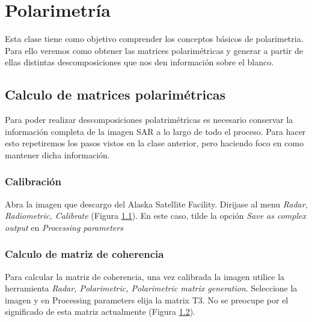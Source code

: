 \chapter{Polarimetría}

Esta clase tiene como objetivo comprender los conceptos básicos de polarimetria. Para ello veremos como obtener las matrices polarimétricas y generar a partir de ellas distintas descomposiciones que nos den información sobre el blanco.

\section{Calculo de matrices polarimétricas}

Para poder realizar descomposiciones polatrimétricas es necesario conservar la información completa de la imagen SAR a lo largo de todo el proceso. Para hacer esto repetiremos los pasos vistos en la clase anterior, pero haciendo foco en como mantener dicha información.

\subsection{Calibración}
Abra la imagen  que descargo del Alaska Satellite Facility.  Dirijase al menu \emph{Radar, Radiometric, Calibrate} (Figura \ref{fig:calibrar}). En este caso, tilde la opción \emph{Save as complex output} en \emph{Processing parameters}


\begin{figure}[h!]
    \centering
    \hfill
    \caption{}
    \label{fig:calibrar}
\end{figure}

\subsection{Calculo de matriz de coherencia}

Para calcular la matriz de coherencia, una vez calibrada la imagen utilice la herramienta \emph{Radar, Polarimetric, Polarimetric matrix generation}. Seleccione la imagen  y en Processing parameters elija la matrix T3. No se preocupe por el significado de esta matriz actualmente (Figura \ref{fig:t3}).

\begin{figure}[h!]
    \centering
    \hfill
    \caption{}
    \label{fig:t3}
\end{figure}

